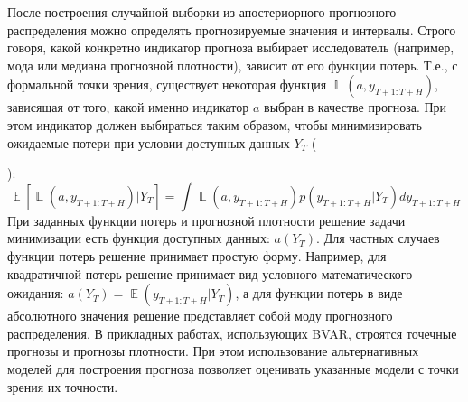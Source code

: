 \documentclass[11pt]{article} %
\DeclareMathOperator{\E}{\mathbb{E}}
\DeclareMathOperator{\Loss}{\mathbb{L}}
\DeclareMathOperator{\chol}{chol}
\newcommand{\eng}[1]{\begin{otherlanguage}{english}#1\end{otherlanguage}}
\let\vec\relax
\DeclareMathOperator{\vec}{vec}
\begin{document}
После построения случайной выборки из апостериорного прогнозного распределения можно определять прогнозируемые значения и интервалы. Строго говоря, какой конкретно индикатор прогноза выбирает исследователь (например, мода или медиана прогнозной плотности), зависит от его функции потерь. Т.е., с формальной точки зрения, существует некоторая функция $\Loss(a, y_{T+1:T+H})$, зависящая от того, какой именно индикатор $a$ выбран в качестве прогноза. При этом индикатор должен выбираться таким образом, чтобы минимизировать ожидаемые потери при условии доступных данных $Y_T$ (\eng{\cite[p.~3]{karlsson_2012}}):
\begin{equation}
\E[\Loss(a,y_{T+1:T+H})|Y_T]=\int \Loss(a, y_{T+1:T+H}) p(y_{T+1:T+H}|Y_T) dy_{T+1:T+H}
\end{equation}
При заданных функции потерь и прогнозной плотности решение задачи минимизации есть функция доступных данных: $a(Y_T)$. Для частных случаев функции потерь решение принимает простую форму. Например, для квадратичной потерь решение принимает вид условного математического ожидания: $a(Y_T)=\E(y_{T+1:T+H}|Y_T)$, а для функции потерь в виде абсолютного значения  решение представляет собой моду прогнозного распределения.
В прикладных работах, использующих BVAR,  строятся точечные прогнозы и прогнозы плотности.  При этом использование альтернативных моделей для построения прогноза позволяет оценивать указанные модели с точки зрения их точности.
\end{document}
